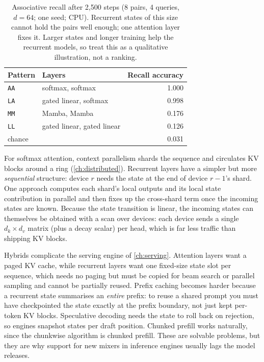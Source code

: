 \begin{table}[t]
\centering\small
\begin{tabular}{@{}llr@{}}
\toprule
Pattern & Layers & Recall accuracy\\
\midrule
\texttt{AA} & softmax, softmax & 1.000\\
\texttt{LA} & gated linear, softmax & 0.998\\
\texttt{MM} & Mamba, Mamba & 0.176\\
\texttt{LL} & gated linear, gated linear & 0.126\\
\midrule
chance & & 0.031\\
\bottomrule
\end{tabular}
\caption{Associative recall after 2{,}500 steps (8 pairs, 4 queries, $d=64$; one seed; CPU). Recurrent states
of this size cannot hold the pairs well enough; one attention layer fixes it. Larger states and longer training
help the recurrent models, so treat this as a qualitative illustration, not a ranking.}
\label{tab:attnalt:mqar}
\end{table}


\begin{systemslens}
For softmax attention, context parallelism shards the sequence and circulates KV blocks around a ring
(\cref{ch:distributed}). Recurrent layers have a simpler but more \emph{sequential} structure: device $r$ needs
the state at the end of device $r-1$'s shard. One approach computes each shard's local outputs and its
local state contribution in parallel and then fixes up the cross-shard term once the incoming states are
known. Because the state transition is linear, the incoming states can themselves be obtained with a scan
over devices: each device sends a single $d_k\times d_v$ matrix (plus a decay scalar) per head, which is far
less traffic than shipping KV blocks.
\end{systemslens}

\begin{systemslens}
Hybrids complicate the serving engine of \cref{ch:serving}. Attention layers want a paged KV cache, while
recurrent layers want one fixed-size state slot per sequence, which needs no paging but must be copied
for beam search or parallel sampling and cannot be partially reused. Prefix caching becomes harder because
a recurrent state summarises an \emph{entire} prefix: to reuse a shared prompt you must have checkpointed
the state exactly at the prefix boundary, not just kept per-token KV blocks. Speculative decoding needs the
state to roll back on rejection, so engines snapshot states per draft position. Chunked prefill works
naturally, since the chunkwise algorithm is chunked prefill. These are solvable problems, but they are
why support for new mixers in inference engines usually lags the model releases.
\end{systemslens}


